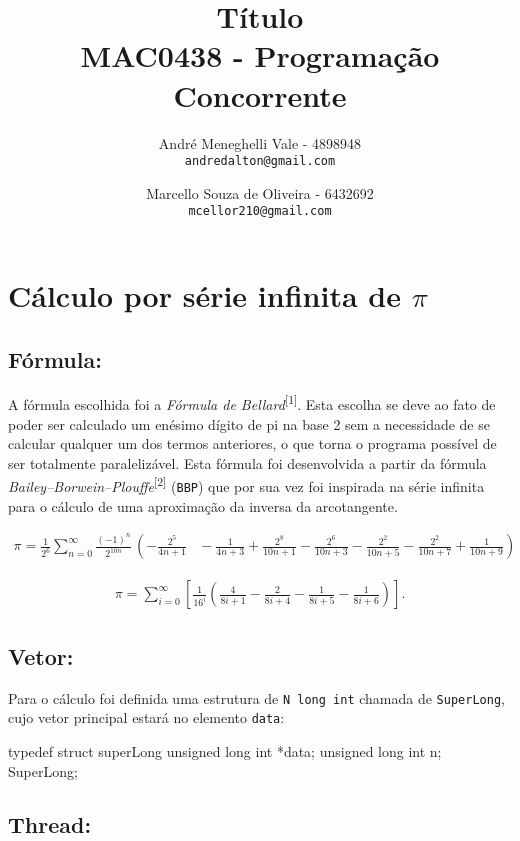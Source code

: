\documentclass[12pt,a4paper]{article}
\title{Título\\MAC0438 - Programação Concorrente}
\author{
    André Meneghelli Vale - 4898948\\
    \texttt{andredalton@gmail.com}
    \and
    Marcello Souza de Oliveira - 6432692\\
    \texttt{mcellor210@gmail.com}
}
\date{}
\begin{document}
\maketitle

\newpage

\section{Cálculo por série infinita de $\pi$}

\subsection{Fórmula:}
A fórmula escolhida foi a \emph{Fórmula de Bellard}\textsuperscript{[1]}. Esta escolha se deve ao fato de poder ser calculado um enésimo dígito de pi na base 2 sem a necessidade de se calcular qualquer um dos termos anteriores, o que torna o programa possível de ser totalmente paralelizável.
Esta fórmula foi desenvolvida a partir da fórmula \emph{Bailey–Borwein–Plouffe}\textsuperscript{[2]} (\verb+BBP+) que por sua vez foi inspirada na série infinita para o cálculo de uma aproximação da inversa da arcotangente.

\begin{align}
\pi = \frac1{2^6} \sum_{n=0}^\infty \frac{(-1)^n}{2^{10n}} \, \left(-\frac{2^5}{4n+1} \right. & {} - \frac1{4n+3} + \frac{2^8}{10n+1} - \frac{2^6}{10n+3} \left. {} - \frac{2^2}{10n+5} - \frac{2^2}{10n+7} + \frac1{10n+9} \right)
\end{align}

\begin{align}
\pi = \sum_{i = 0}^{\infty}\left[ \frac{1}{16^i} \left( \frac{4}{8i + 1} - \frac{2}{8i + 4} - \frac{1}{8i + 5} - \frac{1}{8i + 6} \right) \right]. 
\end{align}

\subsection{Vetor:}

Para o cálculo foi definida uma estrutura de \verb+N long int+ chamada de \verb+SuperLong+, cujo vetor principal estará no elemento \verb+data+:

\begin{code}
typedef struct superLong{
       unsigned long int *data;
       unsigned long int n;
} SuperLong;
\end{code}

\subsection{Thread:}
\end{document}
